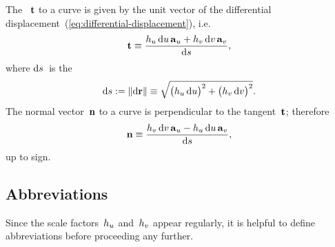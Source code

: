 The ~$\mathop{}\!\boldsymbol{\mathbf{t}}$ to a curve
is given by the unit vector of
the differential displacement~(\ref{eq:differential-displacement}),
i.e.\@
\begin{equation}
  \tangentvec \ideq
    \frac{
      \scalefac[u] \td u \basisvec{u}
        +
      \scalefac[v] \td v \basisvec{v}
    }{
      \td s
    },
  \label{eq:tangent-vector}
\end{equation}
where $\mathop{}\!\mathrm{d} s$~is the 
\begin{equation}
  \td s \defeq \norm{\td \positionvec} \ideq
  \sqrt{
    \roundbr[\big]{\scalefac[u] \td u}^2
      +
    \roundbr[\big]{\scalefac[v] \td v}^2
  }.
  \label{eq:differential-arc-length}
\end{equation}
The normal vector~$\mathop{}\!\boldsymbol{\mathbf{n}}$ to a curve
is perpendicular to the tangent~$\mathop{}\!\boldsymbol{\mathbf{t}}$;
therefore
\begin{equation}
  \normalvec \ideq
    \frac{
      \scalefac[v] \td v \basisvec{u}
        -
      \scalefac[u] \td u \basisvec{v}
    }{
      \td s
    },
  \label{eq:normal-vector}
\end{equation}
up to sign.

\subsection{Abbreviations}
\label{sec:curvilinear.calculus.abbreviations}

Since the scale factors~$\scalefac[u]$ and~$\scalefac[v]$ appear regularly,
it is helpful to define abbreviations
before proceeding any further.


